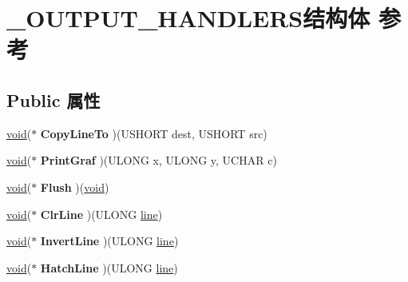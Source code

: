 \hypertarget{struct___o_u_t_p_u_t___h_a_n_d_l_e_r_s}{}\section{\+\_\+\+O\+U\+T\+P\+U\+T\+\_\+\+H\+A\+N\+D\+L\+E\+R\+S结构体 参考}
\label{struct___o_u_t_p_u_t___h_a_n_d_l_e_r_s}
\subsection*{Public 属性}
\begin{DoxyCompactItemize}
\item 
\mbox{\label{struct___o_u_t_p_u_t___h_a_n_d_l_e_r_s_a390c79f2a1e1ab17ad8527032d5a1f4d}} 
\hyperlink{interfacevoid}{void}($\ast$ {\bfseries Copy\+Line\+To} )(U\+S\+H\+O\+RT dest, U\+S\+H\+O\+RT src)
\item 
\mbox{\label{struct___o_u_t_p_u_t___h_a_n_d_l_e_r_s_a5c904ec67d328546eb883cfe0f40278a}} 
\hyperlink{interfacevoid}{void}($\ast$ {\bfseries Print\+Graf} )(U\+L\+O\+NG x, U\+L\+O\+NG y, U\+C\+H\+AR c)
\item 
\mbox{\label{struct___o_u_t_p_u_t___h_a_n_d_l_e_r_s_aedd2051202688c1f6cb5cb82260c900a}} 
\hyperlink{interfacevoid}{void}($\ast$ {\bfseries Flush} )(\hyperlink{interfacevoid}{void})
\item 
\mbox{\label{struct___o_u_t_p_u_t___h_a_n_d_l_e_r_s_a5a2211e7ed1af776e0dd3e5c4b26155f}} 
\hyperlink{interfacevoid}{void}($\ast$ {\bfseries Clr\+Line} )(U\+L\+O\+NG \hyperlink{structline}{line})
\item 
\mbox{\label{struct___o_u_t_p_u_t___h_a_n_d_l_e_r_s_ab2aadcb1e092a2a5a99918d22099e1e4}} 
\hyperlink{interfacevoid}{void}($\ast$ {\bfseries Invert\+Line} )(U\+L\+O\+NG \hyperlink{structline}{line})
\item 
\mbox{\label{struct___o_u_t_p_u_t___h_a_n_d_l_e_r_s_a0aaf6192217f4f22924457ef436d44f8}} 
\hyperlink{interfacevoid}{void}($\ast$ {\bfseries Hatch\+Line} )(U\+L\+O\+NG \hyperlink{structline}{line})

\end{DoxyCompactItemize}
